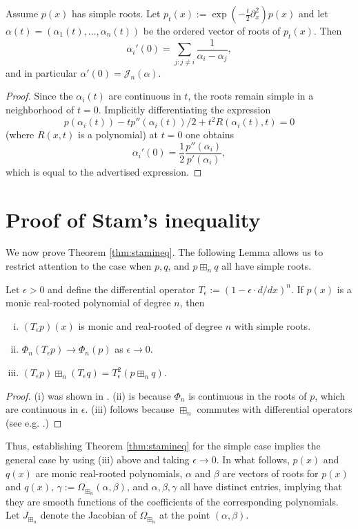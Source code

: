 \documentclass[12pt]{amsart}
\newcommand{\jac}{J_{\boxplus_n}}
\newcommand{\roots}{\Omega_{\boxplus_n}}
\newcommand{\score}{\mathscr{J}_n}
\begin{document}
\begin{lemma}
\label{lem:score}
	Assume $p(x)$ has simple roots. Let $p_t(x):= \exp\left( -\frac{t}{2} \partial_x^2  \right)p(x)$ and let $\alpha(t) = (\alpha_1(t), \dots, \alpha_n(t))$ be the ordered vector of roots of $p_t(x)$. Then 
     $$\alpha_i'(0) = \sum_{j : j\neq i} \frac{1}{\alpha_i-\alpha_j},$$
    and in particular $\alpha'(0) = \score(\alpha)$. 
\end{lemma}
\begin{proof}
	Since the $\alpha_i(t)$ are continuous in $t$, the roots remain simple in a neighborhood of $t=0$. Implicitly differentiating the expression
	$$p(\alpha_i(t))-tp''(\alpha_i(t))/2+t^2R(\alpha_i(t),t)=0$$
	(where $R(x,t)$ is a polynomial) at $t=0$ one obtains
	$$ \alpha_i'(0)=\frac{1}{2}\frac{p''(\alpha_i)}{p'(\alpha_i)},$$
	which is equal to the advertised expression.
\end{proof}


\section{Proof of Stam's inequality}
We now prove Theorem \ref{thm:stamineq}.  The following Lemma allows us to restrict attention to the case when $p,q$, and $p\boxplus_n q$ all have simple roots.

\begin{lemma} Let $\epsilon>0$ and define the differential operator $T_\epsilon:=(1-\epsilon \cdot d/dx)^n$. If $p(x)$ is a monic real-rooted polynomial of degree $n$, then 
	\begin{enumerate}[i)]
	\item $(T_\epsilon p)(x)$ is monic and real-rooted of degree $n$ with simple roots. 
	\item $ \Phi_n(T_\epsilon p)\rightarrow \Phi_n(p)$ as $\epsilon\rightarrow 0$. 
	\item  $(T_\epsilon p)\boxplus_n (T_\epsilon q)= T_\epsilon^2 (p\boxplus_n q)$. 
	\end{enumerate}
\end{lemma}
	\begin{proof} (i) was shown in \cite{nuij1968note}. (ii) is because $\Phi_n$ is continuous in the roots of $p$, which are continuous in $\epsilon$. (iii) follows because $\boxplus_n$ commutes with differential operators (see e.g. \cite{marcus2022finite}.)\end{proof}
		Thus, establishing Theorem \ref{thm:stamineq} for the simple case implies the general case by using (iii) above and taking $\epsilon\rightarrow 0$. In what follows, $p(x)$ and $q(x)$ are monic real-rooted polynomials, $\alpha$ and $\beta$ are vectors of roots for $p(x)$ and $q(x)$, $\gamma:= \roots(\alpha, \beta)$, and $\alpha,\beta,\gamma$ all have distinct entries, implying that they are smooth functions of the coefficients of the corresponding polynomials. Let $\jac$ denote the Jacobian of $\roots$ at the point $(\alpha, \beta)$.
\end{document}
